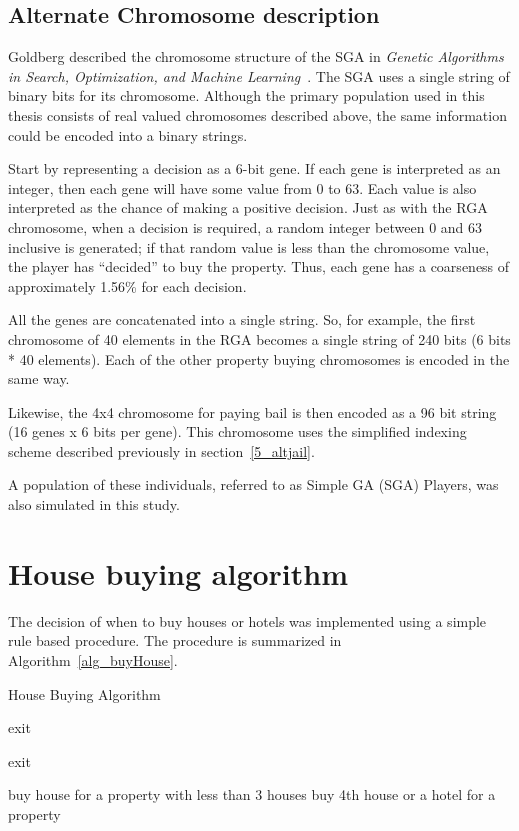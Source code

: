 \subsection{Alternate Chromosome description} \label{5_altchromo}

Goldberg described the chromosome structure of the SGA in \emph{Genetic
Algorithms in Search, Optimization, and Machine
Learning}~\cite{goldberg1989genetic}. The SGA uses a single string of binary
bits for its chromosome. Although the primary population used in this thesis
consists of real valued chromosomes described above, the same information could
be encoded into a binary strings.

Start by representing a decision as a 6-bit gene. If each gene is interpreted as
an integer, then each gene will have some value from 0 to 63. Each value is also
interpreted as the chance of making a positive decision. Just as with the RGA
chromosome, when a decision is required, a random integer between 0 and 63
inclusive is generated; if that random value is less than the chromosome value,
the player has ``decided'' to buy the property. Thus, each gene has a coarseness
of approximately 1.56\% for each decision.

All the genes are concatenated into a single string. So, for example, the first
chromosome of 40 elements in the RGA becomes a single string of 240 bits (6 bits
* 40 elements). Each of the other property buying chromosomes is encoded in the
same way.

Likewise, the 4x4 chromosome for paying bail is then encoded as a 96 bit string
(16 genes x 6 bits per gene). This chromosome uses the simplified indexing
scheme described previously in section~\ref{5_altjail}.

A population of these individuals, referred to as Simple GA (SGA) Players, was
also simulated in this study.

\section{House buying algorithm} \label{5_buy_house}

The decision of when to buy houses or hotels was implemented using a simple rule
based procedure. The procedure is summarized in Algorithm~\ref{alg_buyHouse}.

\begin{algorithm}
\caption{House Buying Algorithm}
\label{alg_buyHouse}
\begin{algorithmic}
  \STATE exit
\ENDIF

  \STATE exit
\ENDIF

    \STATE buy house for a property with less than 3 houses
  \ELSE
    \STATE buy 4th house or a hotel for a property
  \ENDIF
\ENDWHILE
\end{algorithmic}
\end{algorithm}

